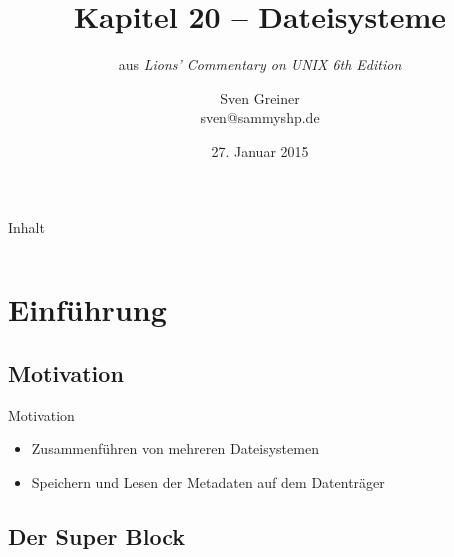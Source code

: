 \documentclass{beamer}
\title{Kapitel 20 -- Dateisysteme}
\subtitle{aus \emph{Lions' Commentary on UNIX 6th Edition}}
\author{Sven Greiner\\\footnotesize\ttfamily sven@sammyshp.de}
\date{27. Januar 2015}
\begin{document}


\begin{frame}[plain]
    \titlepage
\end{frame}




\begin{frame}[plain]{Inhalt}
    \label{TableOfContents}
    \vfill
    \begin{columns}[t]
        \begin{column}{.5\textwidth}
            \tableofcontents[sections={1}]
        \end{column}
        \begin{column}{.5\textwidth}
            \tableofcontents[sections={2}]
        \end{column}
    \end{columns}
    \vfill
\end{frame}




\section{Einführung}

\begin{frame}[plain]
    \sectionpage
\end{frame}




\subsection{Motivation}

\begin{frame}{Motivation}
    \begin{itemize}
        \item Zusammenführen von mehreren Dateisystemen
        \medskip
        \item Speichern und Lesen der Metadaten auf dem Datenträger
    \end{itemize}
\end{frame}




\subsection{Der Super Block}
\end{document}
